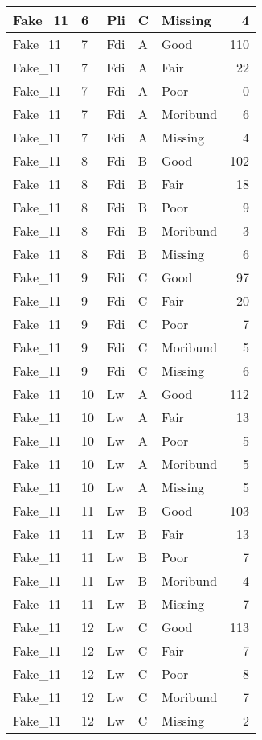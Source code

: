 \documentclass[
]{article}
\begin{document}
\begin{tabular}{l|l|l|l|l|r}
\hline
Fake\_11 & 6 & Pli & C & Missing & 4\\
\hline
Fake\_11 & 7 & Fdi & A & Good & 110\\
\hline
Fake\_11 & 7 & Fdi & A & Fair & 22\\
\hline
Fake\_11 & 7 & Fdi & A & Poor & 0\\
\hline
Fake\_11 & 7 & Fdi & A & Moribund & 6\\
\hline
Fake\_11 & 7 & Fdi & A & Missing & 4\\
\hline
Fake\_11 & 8 & Fdi & B & Good & 102\\
\hline
Fake\_11 & 8 & Fdi & B & Fair & 18\\
\hline
Fake\_11 & 8 & Fdi & B & Poor & 9\\
\hline
Fake\_11 & 8 & Fdi & B & Moribund & 3\\
\hline
Fake\_11 & 8 & Fdi & B & Missing & 6\\
\hline
Fake\_11 & 9 & Fdi & C & Good & 97\\
\hline
Fake\_11 & 9 & Fdi & C & Fair & 20\\
\hline
Fake\_11 & 9 & Fdi & C & Poor & 7\\
\hline
Fake\_11 & 9 & Fdi & C & Moribund & 5\\
\hline
Fake\_11 & 9 & Fdi & C & Missing & 6\\
\hline
Fake\_11 & 10 & Lw & A & Good & 112\\
\hline
Fake\_11 & 10 & Lw & A & Fair & 13\\
\hline
Fake\_11 & 10 & Lw & A & Poor & 5\\
\hline
Fake\_11 & 10 & Lw & A & Moribund & 5\\
\hline
Fake\_11 & 10 & Lw & A & Missing & 5\\
\hline
Fake\_11 & 11 & Lw & B & Good & 103\\
\hline
Fake\_11 & 11 & Lw & B & Fair & 13\\
\hline
Fake\_11 & 11 & Lw & B & Poor & 7\\
\hline
Fake\_11 & 11 & Lw & B & Moribund & 4\\
\hline
Fake\_11 & 11 & Lw & B & Missing & 7\\
\hline
Fake\_11 & 12 & Lw & C & Good & 113\\
\hline
Fake\_11 & 12 & Lw & C & Fair & 7\\
\hline
Fake\_11 & 12 & Lw & C & Poor & 8\\
\hline
Fake\_11 & 12 & Lw & C & Moribund & 7\\
\hline
Fake\_11 & 12 & Lw & C & Missing & 2\\

\end{tabular}
\end{document}
